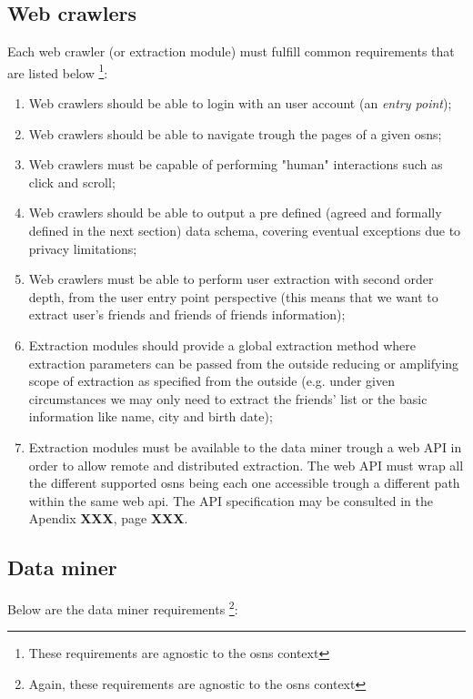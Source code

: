 \subsection{Web crawlers}
Each web crawler (or extraction module) must fulfill common requirements that are listed below \footnote{These requirements are agnostic to the \glspl{osn} context}:
\begin{enumerate}
    \item Web crawlers should be able to login with an user account (an \textit{entry point});
    \item Web crawlers should be able to navigate trough the pages of a given \glspl{osn};
    \item Web crawlers must be capable of performing "human" interactions such as click and scroll;
    \item Web crawlers should be able to output a pre defined (agreed and formally defined in the next section) data schema, covering eventual
    exceptions due to privacy limitations;
    \item Web crawlers must be able to perform user extraction with second order depth, from the user entry point perspective (this means that we want to extract user's friends and friends of friends information);
    \item Extraction modules should provide a global extraction method where extraction parameters can be passed from the outside reducing or amplifying scope of extraction as specified from the outside (e.g. under given circumstances we may only need to extract the friends' list or the basic information like name, city and birth date);
    \item Extraction modules must be available to the data miner trough a web API in order to allow remote and distributed extraction. The web API must wrap all the different supported \glspl{osn} being each one accessible trough a different path within the same web api. The API specification may be consulted in the Apendix \textbf{XXX}, page \textbf{XXX}.
\end{enumerate}

\subsection{Data miner}
Below are the data miner requirements \footnote{Again, these requirements are agnostic to the \glspl{osn} context}:

